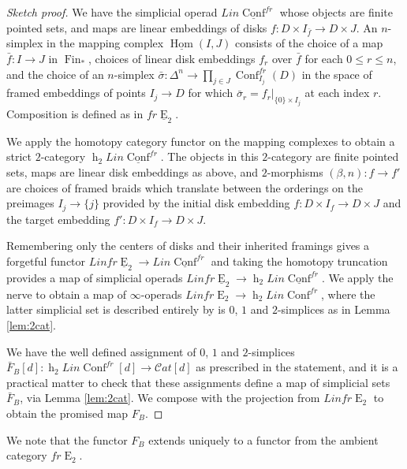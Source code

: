 \documentclass[reqno]{amsart}
\theoremstyle{definition}
\newcommand{\msc}[1]{\mathscr{#1}}
\newcommand{\opn}[1]{\operatorname{#1}}
\newcommand{\uHom}{\underline{\operatorname{Hom}}}
\newcommand{\sCat}{\msc{C}\!at}
\DeclareMathOperator{\Fin}{Fin}
\renewcommand{\1}{\mathbf{1}}
\begin{document}
\begin{proof}[Sketch proof]
We have the simplicial operad $Lin\underline{\opn{Conf}}^{fr}$ whose objects are finite pointed sets, and maps are linear embeddings of disks $f:D\times I_{\bar{f}}\to D\times J$.  An $n$-simplex in the mapping complex $\uHom(I,J)$ consists of the choice of a map $\bar{f}:I\to J$ in $\Fin_{\ast}$, choices of linear disk embeddings $f_r$ over $\bar{f}$ for each $0\leq r\leq n$, and the choice of an $n$-simplex $\bar{\sigma}:\Delta^n\to \prod_{j\in J}\opn{Conf}^{fr}_{I_j}(D)$ in the space of framed embeddings of points $I_j\to D$ for which $\bar{\sigma}_r=f_r|_{\{0\}\times I_j}$ at each index $r$.  Composition is defined as in $fr\underline{\opn{E}}_2$.
\par

We apply the homotopy category functor on the mapping complexes to obtain a strict $2$-category $\opn{h}_2Lin\underline{\opn{Conf}}^{fr}$.  The objects in this $2$-category are finite pointed sets, maps are linear disk embeddings as above, and $2$-morphisms $(\beta,n):f\to f'$ are choices of framed braids which translate between the orderings on the preimages $I_j\to \{j\}$ provided by the initial disk embedding $f:D\times I_{f}\to D\times J$ and the target embedding $f':D\times I_{f}\to D\times J$.
\par

Remembering only the centers of disks and their inherited framings gives a forgetful functor $Linfr\underline{\opn{E}}_2\to Lin\underline{\opn{Conf}}^{fr}$ and taking the homotopy truncation provides a map of simplicial operads $Linfr\underline{\opn{E}}_2\to \opn{h}_2Lin\underline{\opn{Conf}}^{fr}$.  We apply the nerve to obtain a map of $\infty$-operads $Linfr\opn{E}_2\to \opn{h}_2Lin\opn{Conf}^{fr}$, where the latter simplicial set is described entirely by is $0$, $1$ and $2$-simplices as in Lemma \ref{lem:2cat}.
\par

We have the well defined assignment of $0$, $1$ and $2$-simplices $\bar{F}_B[d]:\opn{h}_2Lin\opn{Conf}^{fr}[d]\to \sCat[d]$ as prescribed in the statement, and it is a practical matter to check that these assignments define a map of simplicial sets $\bar{F}_B$, via Lemma \ref{lem:2cat}.  We compose with the projection from $Linfr\opn{E}_2$ to obtain the promised map $F_B$.
\end{proof}

We note that the functor $F_B$ extends uniquely to a functor from the ambient category $fr\opn{E}_2$.
\end{document}
